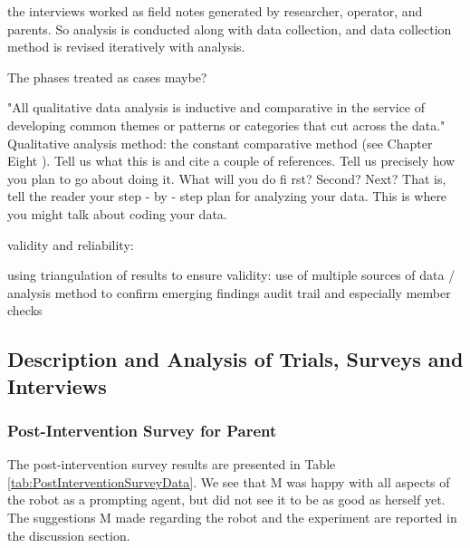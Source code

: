 the interviews worked as field notes generated by researcher, operator, and parents.  So analysis is conducted along with data collection, and data collection method is revised iteratively with analysis.

The phases treated as cases maybe?

"All qualitative data analysis is inductive and comparative in
the service of developing common themes or patterns or categories
that cut across the data."
Qualitative analysis method:
the constant comparative method (see Chapter
Eight ). Tell us what this is and cite a couple of references. Tell us
precisely how you plan to go about doing it. What will you do fi rst?
Second? Next? That is, tell the reader your step - by - step plan for
analyzing your data. This is where you might talk about coding
your data.

validity and reliability:

using triangulation of results to ensure validity: use of multiple sources of data / analysis method to confirm emerging findings
audit trail and especially
member checks


\subsection{Description and Analysis of Trials, Surveys and Interviews}


\subsubsection{Post-Intervention Survey for Parent}
The post-intervention survey results are presented in Table \ref{tab:PostInterventionSurveyData}.  We see that M was happy with all aspects of the robot as a prompting agent, but did not see it to be as good as herself yet.  The suggestions M made regarding the robot and the experiment are reported in the discussion section.

